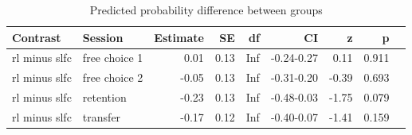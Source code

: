 \documentclass[pdflatex,sn-mathphys-num]{sn-jnl}%
\theoremstyle{thmstyleone}%
\theoremstyle{thmstyletwo}%
\theoremstyle{thmstylethree}%
\begin{document}
\begin{appendices}
\begin{table}[ht]
\caption{Predicted probability difference between groups}\label{strategychoice_theorybest_groupdiff}
\begin{tabular}{llrrrrrrl}
  \hline
 Contrast & Session & Estimate & SE & df & CI & z & p \\ 
  \hline
rl minus slfc & free choice 1 & 0.01 & 0.13 & Inf & -0.24-0.27 & 0.11 &  0.911 \\ 
rl minus slfc & free choice 2 & -0.05 & 0.13 & Inf & -0.31-0.20 & -0.39 &   0.693 \\ 
rl minus slfc & retention & -0.23 & 0.13 & Inf & -0.48-0.03 & -1.75 &  0.079 \\ 
rl minus slfc & transfer & -0.17 & 0.12 & Inf & -0.40-0.07 & -1.41 &  0.159 \\ 
   \hline
\end{tabular}
\end{table}





\end{appendices}
\end{document}
